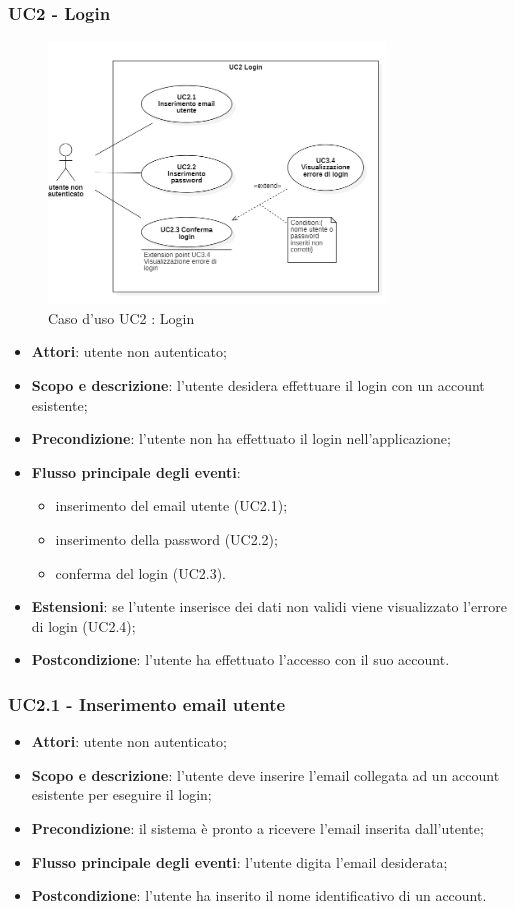 \subsubsection{UC2 - Login}
\begin{figure}[H]
    \centering
    \includegraphics[width=0.8\textwidth]{res/images/UC2.png}
    \caption{Caso d'uso UC2 : Login}
\end{figure}
\begin{itemize}
\item \textbf{Attori}: utente non autenticato;
\item \textbf{Scopo e descrizione}: l’utente desidera effettuare il login con un account esistente;
\item \textbf{Precondizione}: l’utente non ha effettuato il login nell’applicazione;
\item \textbf{Flusso principale degli eventi}:
\begin{itemize}
    \item inserimento del email utente (UC2.1);
    \item inserimento della password (UC2.2);
    \item conferma del login (UC2.3).
\end{itemize}
\item \textbf{Estensioni}: se l’utente inserisce dei dati non validi viene visualizzato l’errore di login (UC2.4);
\item \textbf{Postcondizione}: l’utente ha effettuato l’accesso con il suo account.
\end{itemize}
\subsubsection{UC2.1 - Inserimento email utente}
\begin{itemize}
\item \textbf{Attori}: utente non autenticato;
\item \textbf{Scopo e descrizione}: l’utente deve inserire l'email collegata ad un account esistente per eseguire il login;
\item \textbf{Precondizione}: il sistema è pronto a ricevere l'email inserita dall’utente;
\item \textbf{Flusso principale degli eventi}: l’utente digita l'email desiderata;
\item \textbf{Postcondizione}: l’utente ha inserito il nome identificativo di un account.
\end{itemize}
